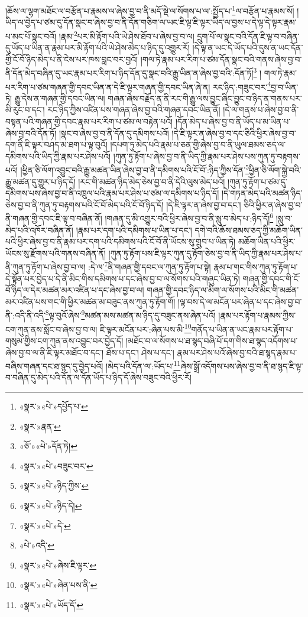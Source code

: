 །ཆོས་ལ་ལྷག་མཐོང་ལ་བརྩོན་པ་རྣམས་ལ་ཞེས་བྱ་བ་ནི་མདོ་སྡེ་ལ་སོགས་པ་ལ་:སྤྱོད་པ་\footnote{«སྣར་»«པེ་»དཔྱོད་པ་}ལ་བརྩོན་པ་རྣམས་སོ། །ཡིད་ལ་བྱེད་པ་ཙམ་དུ་དོན་སྣང་བ་ཞེས་བྱ་བ་ནི་དོན་གཅིག་ལ་ཡང་ཇི་ལྟ་ཇི་ལྟར་ཡིད་ལ་བྱས་པ་དེ་ལྟ་དེ་ལྟར་རྣམ་པ་མང་པོ་སྣང་བའོ། །རྣམ་\footnote{«སྣར་»རྣན་}པར་མི་རྟོག་པའི་ཡེ་ཤེས་ཐོབ་པ་ཞེས་བྱ་བ་ལ། དྲུག་པོ་ལ་སྣང་བའི་དོན་ཇི་ལྟ་བ་བཞིན་དུ་ཡོད་པ་ཡིན་ན་རྣམ་པར་མི་རྟོག་པའི་ཡེ་ཤེས་མེད་པ་ཉིད་དུ་འགྱུར་རོ། །དེ་ལྟ་ན་ཡང་དེ་ཡོད་པའི་དུས་ན་ཡང་དོན་གྱི་ངོ་བོ་ཉིད་མེད་པ་ནི་ངེས་པར་ཁས་བླང་བར་བྱའོ། །གལ་ཏེ་རྣམ་པར་རིག་པ་ཙམ་དོན་སྣང་བའི་གནས་ཞེས་བྱ་བ་ནི་དོན་མེད་བཞིན་དུ་ཡང་རྣམ་པར་རིག་པ་ཉིད་དོན་དུ་སྣང་བའི་རྒྱུ་ཡིན་ན་ཞེས་བྱ་བའི་:དོན་ཏོ།\footnote{«ཅོ་»«པེ་»དོན་ཏེ།} །
གལ་ཏེ་རྣམ་པར་རིག་པ་ཙམ་གཞན་གྱི་དབང་ཡིན་ན་དེ་ཇི་ལྟར་གཞན་གྱི་དབང་ཡིན་ཞེ་ན། རང་ཉིད་:གཟུང་བར་\footnote{«སྣར་»«པེ་»བཟུང་བར་}བྱ་བ་ཡིན་ཏེ། རྒྱུ་དེས་ན་གཞན་གྱི་དབང་ཡིན་ལ། གཞན་ཞེས་བརྗོད་ན་ནི་རང་གི་རྒྱུ་ལས་བྱུང་ཞིང་བྱུང་བ་ཉིད་ན་གནས་པར་མི་རུང་བ་དང་། རང་ཉིད་ཀྱིས་འཛིན་པས་གཞན་ཞེས་བྱ་བའི་གཞན་དབང་ཡིན་ནོ། །དེ་ལ་གནས་པ་ཞེས་བྱ་བ་ནི་བསྟན་པའི་གཞན་གྱི་དབང་རྣམ་པར་རིག་པ་ཙམ་ལ་བརྟེན་པའོ། །དོན་མེད་པ་ཞེས་བྱ་བ་ནི་ཡོད་པ་མ་ཡིན་པ་ཞེས་བྱ་བའི་དོན་ཏོ། །སྣང་བ་ཞེས་བྱ་བ་ནི་དོན་དུ་དམིགས་པའོ། །དེ་ཇི་ལྟར་ན་ཞེས་བྱ་བ་དང་ཅིའི་ཕྱིར་ཞེས་བྱ་བ་དག་ནི་ཇི་ལྟར་བཤད་མ་ཐག་པ་ལྟ་བུའོ། །དཔག་ཏུ་མེད་པའི་རྣམ་པ་ཅན་གྱི་ཞེས་བྱ་བ་ནི་ཡུལ་ཐམས་ཅད་ལ་དམིགས་པའི་ཡིད་ཀྱི་རྣམ་པར་ཤེས་པའོ། །ཀུན་ཏུ་རྟོག་པ་ཞེས་བྱ་བ་ནི་ཡིད་ཀྱི་རྣམ་པར་ཤེས་པས་ཀུན་ཏུ་བརྟགས་པའོ། །ཕྱིན་ཅི་ལོག་འབྱུང་བའི་རྒྱུ་མཚན་ཡིན་ཞེས་བྱ་བ་ནི་དམིགས་པའི་ངོ་བོ་:ཉིད་ཀྱིས་དོན་\footnote{«སྣར་»«པེ་»ཉིད་ཀྱིས་}ཕྱིན་ཅི་ལོག་སྐྱེ་བའི་རྒྱུ་མཚན་དུ་གྱུར་པ་ཉིད་དོ། །རང་གི་མཚན་ཉིད་མེད་ཅེས་བྱ་བ་ནི་དེའི་ལུས་མེད་པའོ། །ཀུན་ཏུ་རྟོག་པ་ཙམ་དུ་དམིགས་པས་ཞེས་བྱ་བ་ནི་འཁྲུལ་པའི་རྣམ་པར་ཤེས་པ་ཙམ་ལ་དམིགས་པ་ཉིད་དོ། །དེ་གཏན་མེད་པའི་མཚན་ཉིད་ཅེས་བྱ་བ་ནི་ཀུན་ཏུ་བརྟགས་པའི་ངོ་བོ་མེད་པའི་ངོ་བོ་ཉིད་དོ། །དེ་ཇི་ལྟར་ན་ཞེས་བྱ་བ་དང་། ཅིའི་ཕྱིར་ན་ཞེས་བྱ་བ་ནི་གཞན་གྱི་དབང་ཇི་ལྟ་བ་བཞིན་ནོ། །གཞན་དུ་མི་འགྱུར་བའི་ཕྱིར་ཞེས་བྱ་བ་ནི་སླུ་བ་མེད་པ་:ཉིད་དོ།\footnote{«སྣར་»«པེ་»ཉིད་དེ།} །སླུ་བ་མེད་པའི་འཁོར་བཞིན་ནོ། །རྣམ་པར་དག་པའི་དམིགས་པ་ཡིན་པ་དང་། དགེ་བའི་ཆོས་ཐམས་ཅད་ཀྱི་མཆོག་ཡིན་པའི་ཕྱིར་ཞེས་བྱ་བ་ནི་རྣམ་པར་དག་པའི་དམིགས་པའི་ངོ་བོ་ནི་ཡོངས་སུ་གྲུབ་པ་ཡིན་ཏེ། མཆོག་ཡིན་པའི་ཕྱིར་ཡོངས་སུ་རྫོགས་པའི་གནས་བཞིན་ནོ། །ཀུན་ཏུ་རྟོག་པས་ཇི་ལྟར་ཀུན་དུ་རྟོག་ཅེས་བྱ་བ་ནི་ཡིད་ཀྱི་རྣམ་པར་ཤེས་པ་ནི་ཀུན་ཏུ་རྟོག་པ་ཞེས་བྱ་བ་ལ། :དེ་ལ་\footnote{«སྣར་»«པེ་»དེ་}ནི་གཞན་གྱི་དབང་ལ་ཀུན་ཏུ་རྟོག་པ་སྟེ། རྣམ་པ་གང་གིས་ཀུན་ཏུ་རྟོག་པ་དེ་སྟོན་པར་བྱེད་པ་དེ་ནི་མིང་གིས་དམིགས་པ་དང་ཞེས་བྱ་བ་ལ་སོགས་པའི་གཞུང་ཡིན་ཏེ། གཞན་གྱི་དབང་གི་ངོ་བོ་ཉིད་ལ་དེར་མཚན་མར་འཛིན་པ་དང་ཞེས་བྱ་བ་ལ། གཞན་གྱི་དབང་ཉིད་ལ་མིག་ལ་སོགས་པའི་མིང་གི་མཚན་མར་འཛིན་པས་གང་གི་ཕྱིར་མཚན་མ་བཟུང་ནས་ཀུན་ཏུ་རྟོག་གོ། །ལྟ་བས་དེ་ལ་མངོན་པར་ཞེན་པ་དང་ཞེས་བྱ་བ་ནི་:འདི་ནི་འདི་\footnote{«པེ་»འདི་}ལྟ་བུའོ་ཞེས་\footnote{«སྣར་»«པེ་»ཞེས་ཇི་ལྟར་}མཚན་མས་མཚན་མ་ཉིད་དུ་བཟུང་ནས་ཞེན་པའོ། །རྣམ་པར་རྟོག་པ་རྣམས་ཀྱིས་ངག་ཀུན་ནས་སློང་བ་ཞེས་བྱ་བ་ལ། ཇི་ལྟར་མངོན་པར་:ཞེན་པས་མི་\footnote{«སྣར་»«པེ་»ཞེན་པས་ནི་}གནོད་པ་ཡིན་ན་ཡང་རྣམ་པར་རྟོག་པ་གསུམ་གྱིས་ངག་ཀུན་ནས་འབྱུང་བར་བྱེད་དོ། །མཐོང་བ་ལ་སོགས་པ་ཐ་སྙད་བཞི་པོ་དག་གིས་ཐ་སྙད་འདོགས་པ་ཞེས་བྱ་བ་ལ་ནི་ཇི་ལྟར་མཐོང་བ་དང་། ཐོས་པ་དང་། ཤེས་པ་དང་། རྣམ་པར་ཤེས་པའོ་ཞེས་བྱ་བའི་ཐ་སྙད་རྣམ་པ་བཞིས་གཞན་དང་ཐ་སྙད་དུ་བྱེད་པའོ། །མེད་པའི་དོན་ལ་:ཡོད་པ་\footnote{«སྣར་»«པེ་»ཡོད་དོ་}ཞེས་སྒྲོ་འདོགས་པས་ཞེས་བྱ་བ་ནི་ཐ་སྙད་ཇི་ལྟ་བ་བཞིན་དུ་མེད་པའི་དོན་ལ་དོན་ཡོད་པ་ཉིད་དོ་ཞེས་བཟུང་བའི་ཕྱིར་རོ། 